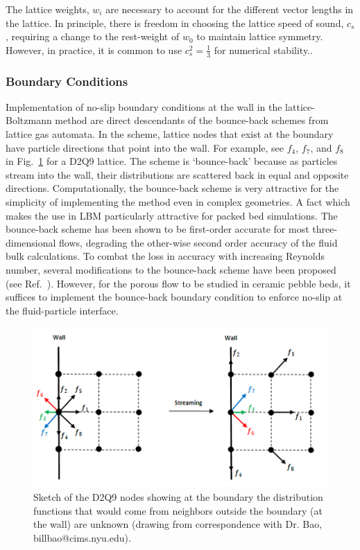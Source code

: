The lattice weights, $w_i$ are necessary to account for the different vector lengths in the lattice. In principle, there is freedom in choosing the lattice speed of sound, $c_s$, requiring a change to the rest-weight of $w_0$ to maintain lattice symmetry. However, in practice, it is common to use $c_s^2 = \frac{1}{3}$ for numerical stability.\cite{Latt2007,succi2001lattice}.




\subsubsection{Boundary Conditions}
Implementation of no-slip boundary conditions at the wall in the lattice-Boltzmann method are direct descendants of the bounce-back schemes from lattice gas automata. In the scheme, lattice nodes that exist at the boundary have particle directions that point into the wall. For example, see $f_4$, $f_7$, and $f_8$ in Fig.~\ref{fig:wall-lattice-bc} for a D2Q9 lattice. The scheme is `bounce-back' because as particles stream into the wall, their distributions are scattered back in equal and opposite directions. Computationally, the bounce-back scheme is very attractive for the simplicity of implementing the method even in complex geometries. A fact which makes the use in LBM particularly attractive for packed bed simulations.\cite{Chen1998a} The bounce-back scheme has been shown to be first-order accurate for most three-dimensional flows, degrading the other-wise second order accuracy of the fluid bulk calculations.\cite{Zou1997,Chen1998a} To combat the loss in accuracy with increasing Reynolds number, several modifications to the bounce-back scheme have been proposed (see Ref.~\cite{Chen1998a}). However, for the porous flow to be studied in ceramic pebble beds, it suffices to implement the bounce-back boundary condition to enforce no-slip at the fluid-particle interface.\cite{Chen1998a,Luo2003a}

\begin{figure}[t]
	\centering
	\includegraphics[width=\singleimagewidth]{chapters/figures/lbm/ongrid}
	\caption{Sketch of the D2Q9 nodes showing at the boundary the distribution functions that would come from neighbors outside the boundary (at the wall) are unknown (drawing from correspondence with Dr. Bao, billbao@cims.nyu.edu).}\label{fig:wall-lattice-bc}
\end{figure}


